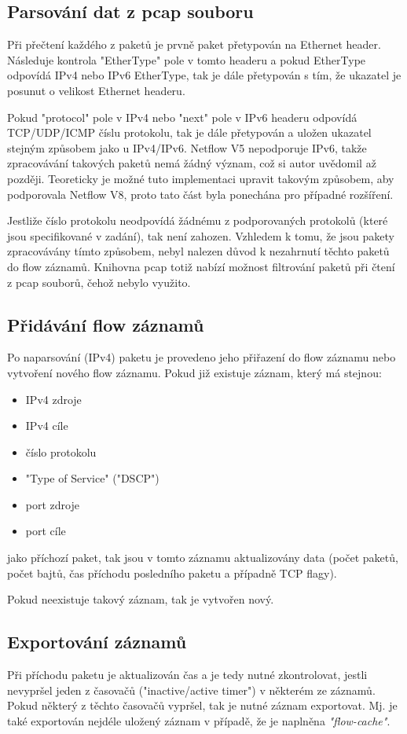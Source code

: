 \documentclass{article}
\begin{document}
\subsection{Parsování dat z pcap souboru}
Při přečtení každého z paketů je prvně paket přetypován
na Ethernet header. Následuje kontrola "EtherType" pole v tomto headeru 
a pokud EtherType odpovídá IPv4 nebo IPv6 EtherType, tak je dále přetypován
s tím, že ukazatel je posunut o velikost Ethernet headeru.

Pokud "protocol" pole v IPv4 nebo "next" pole v IPv6 headeru odpovídá
TCP/UDP/ICMP číslu protokolu, tak je dále přetypován
a uložen ukazatel stejným způsobem jako u IPv4/IPv6.
Netflow V5 nepodporuje IPv6, takže zpracovávání takových paketů nemá
žádný význam, což si autor uvědomil až později.
Teoreticky je možné tuto implementaci upravit takovým způsobem, aby
podporovala Netflow V8, proto tato část byla ponechána pro případné
rozšíření.

Jestliže číslo protokolu neodpovídá žádnému z podporovaných protokolů
(které jsou specifikované v zadání), tak není zahozen.
Vzhledem k tomu, že jsou pakety zpracovávány tímto způsobem,
nebyl nalezen důvod k nezahrnutí těchto paketů do flow záznamů.
Knihovna pcap totiž nabízí možnost filtrování paketů při čtení
z pcap souborů, čehož nebylo využito.

\subsection{Přidávání flow záznamů}
Po naparsování (IPv4) paketu je provedeno jeho přiřazení do flow záznamu
nebo vytvoření nového flow záznamu.
Pokud již existuje záznam, který má stejnou:
\begin{itemize}
    \item IPv4 zdroje
    \item IPv4 cíle
    \item číslo protokolu
    \item "Type of Service" ("DSCP")
    \item port zdroje
    \item port cíle
\end{itemize}
jako příchozí paket, tak jsou v tomto záznamu aktualizovány data
(počet paketů, počet bajtů, čas příchodu posledního paketu a případně TCP flagy).

Pokud neexistuje takový záznam, tak je vytvořen nový.

\subsection{Exportování záznamů}
Při příchodu paketu je aktualizován čas a je tedy nutné zkontrolovat,
jestli nevypršel jeden z časovačů ("inactive/active timer") v některém ze záznamů.
Pokud některý z těchto časovačů vypršel, tak je nutné záznam exportovat.
Mj. je také exportován nejdéle uložený záznam v případě, že je naplněna
\textit{"flow-cache"}.
\end{document}
